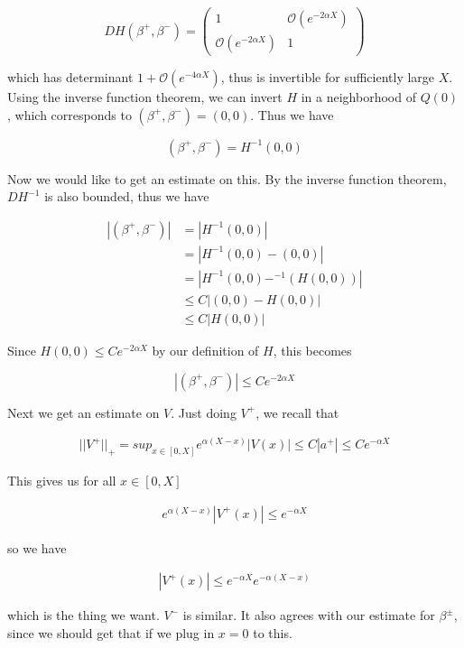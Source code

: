 \documentclass[12pt]{article}
\begin{document}
\begin{equation}
D H(\beta^+, \beta^-) = 
\begin{pmatrix}
1 & \mathcal{O}(e^{-2 \alpha X}) \\
\mathcal{O}(e^{-2 \alpha X}) &  1 
\end{pmatrix}
\end{equation}

which has determinant $1 + \mathcal{O}(e^{-4 \alpha X})$, thus is invertible for sufficiently large $X$. Using the inverse function theorem, we can invert $H$ in a neighborhood of $Q(0)$, which corresponds to $(\beta^+, \beta^-) = (0, 0)$. Thus we have 

\[
(\beta^+, \beta^-) = H^{-1}(0, 0)
\]

Now we would like to get an estimate on this. By the inverse function theorem, $D H^{-1}$ is also bounded, thus we have 

\begin{align*}
| (\beta^+, \beta^-) | &= | H^{-1}(0, 0) | \\
&= | H^{-1}(0, 0) - (0, 0) | \\
&= | H^{-1}(0, 0) - ^{-1}(H(0, 0)) | \\
& \leq C | (0, 0) - H(0, 0) | \\
& \leq C |H(0, 0)|
\end{align*}

Since $H(0, 0) \leq C e^{-2 \alpha X}$ by our definition of $H$, this becomes

\[
| (\beta^+, \beta^-) | \leq C e^{-2 \alpha X}
\]

Next we get an estimate on $V$. Just doing $V^+$, we recall that

\begin{align*}
||V^+||_+ = sup_{x \in [0, X]} e^{\alpha(X - x)}|V(x)| \leq C |a^+| \leq C e^{-\alpha X}
\end{align*}

This gives us for all $x \in [0, X]$

\begin{align*}
e^{\alpha(X - x)}|V^+(x)| \leq e^{-\alpha X} 
\end{align*}

so we have 

\begin{align*}
|V^+(x)| \leq e^{-\alpha X} e^{-\alpha(X - x)}
\end{align*}

which is the thing we want. $V^-$ is similar. It also agrees with our estimate for $\beta^\pm$, since we should get that if we plug in $x = 0$ to this.\\
\end{document}
